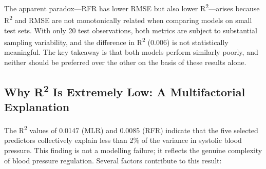 ﻿\documentclass[conference]{IEEEtran}
\begin{document}
The apparent paradox---RFR has lower RMSE but also lower R\textsuperscript{2}---arises because R\textsuperscript{2} and RMSE are not monotonically related when comparing models on small test sets. With only 20 test observations, both metrics are subject to substantial sampling variability, and the difference in R\textsuperscript{2} (0.006) is not statistically meaningful. The key takeaway is that both models perform similarly poorly, and neither should be preferred over the other on the basis of these results alone.

\subsection{Why R\textsuperscript{2} Is Extremely Low: A Multifactorial Explanation}

The R\textsuperscript{2} values of 0.0147 (MLR) and 0.0085 (RFR) indicate that the five selected predictors collectively explain less than 2\% of the variance in systolic blood pressure. This finding is not a modelling failure; it reflects the genuine complexity of blood pressure regulation. Several factors contribute to this result:
\end{document}
